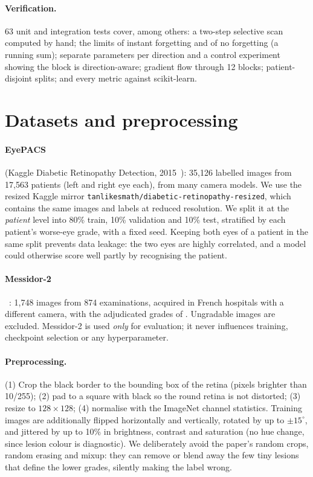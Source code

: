 \documentclass[11pt,a4paper]{article}
\begin{document}
\paragraph{Verification.} 63 unit and integration tests cover, among others: a
two-step selective scan computed by hand; the limits of instant forgetting and of
no forgetting (a running sum); separate parameters per direction and a control
experiment showing the block is direction-aware; gradient flow through 12 blocks;
patient-disjoint splits; and every metric against scikit-learn.

\section{Datasets and preprocessing}

\paragraph{EyePACS} (Kaggle Diabetic Retinopathy Detection, 2015~\cite{eyepacs2015}):
35,126 labelled images from 17,563 patients (left and right eye each), from many
camera models. We use the resized Kaggle mirror
\texttt{tanlikesmath/diabetic-retinopathy-resized}, which contains the same images
and labels at reduced resolution. We split it at the \emph{patient} level into 80\% train, 10\%
validation and 10\% test, stratified by each patient's worse-eye grade, with a fixed
seed. Keeping both eyes of a patient in the same split prevents data leakage: the
two eyes are highly correlated, and a model could otherwise score well partly by
recognising the patient.

\paragraph{Messidor-2}~\cite{decenciere2014messidor,abramoff2013messidor2}:
1,748 images from 874 examinations, acquired in French hospitals with a different
camera, with the adjudicated grades of \citet{krause2018grader}. Ungradable images
are excluded. Messidor-2 is used \emph{only} for evaluation; it never influences
training, checkpoint selection or any hyperparameter.

\paragraph{Preprocessing.} (1) Crop the black border to the bounding box of the
retina (pixels brighter than 10/255); (2) pad to a square with black so the round
retina is not distorted; (3) resize to $128\times128$; (4) normalise with the
ImageNet channel statistics. Training images are additionally flipped horizontally
and vertically, rotated by up to $\pm15^\circ$, and jittered by up to 10\% in
brightness, contrast and saturation (no hue change, since lesion colour is
diagnostic). We deliberately avoid the paper's random crops, random erasing and
mixup: they can remove or blend away the few tiny lesions that define the lower
grades, silently making the label wrong.
\end{document}
